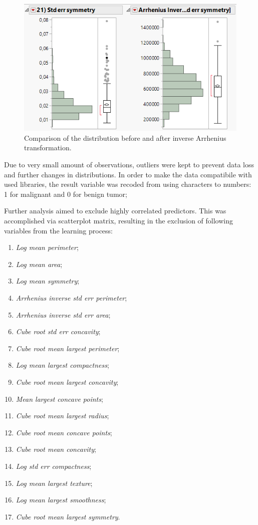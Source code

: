 	\begin{figure}[!ht]
		\centering
		\includegraphics[width=0.7\linewidth]{Rysunki/Rozdzial3/arrhenius}
		\caption{Comparison of the distribution before and after inverse Arrhenius transformation.}
		\label{fig:arrhenius}
	\end{figure}
	
	Due to very small amount of observations, outliers were kept to prevent data loss and further changes in distributions. In order to make the data compatibile with used libraries, the result variable was recoded from using characters to numbers: 1 for malignant and 0 for benign tumor;
	
	Further analysis aimed to exclude highly correlated predictors. This was accomplished via scatterplot matrix, resulting in the exclusion of following variables from the learning process:
	
	\begin{enumerate}
		\item \textit{Log mean perimeter};
		\item \textit{Log mean area};
		\item \textit{Log mean symmetry};
		\item \textit{Arrhenius inverse std err perimeter};
		\item \textit{Arrhenius inverse std err area};
		\item \textit{Cube root std err concavity};
		\item \textit{Cube root mean largest perimeter};
		\item \textit{Log mean largest compactness};
		\item \textit{Cube root mean largest concavity};
		\item \textit{Mean largest concave points};
		\item \textit{Cube root mean largest radius};
		\item \textit{Cube root mean concave points};
		\item \textit{Cube root mean concavity};
		\item \textit{Log std err compactness};
		\item \textit{Log mean largest texture};
		\item \textit{Log mean largest smoothness};
		\item \textit{Cube root mean largest symmetry}.
	\end{enumerate}

